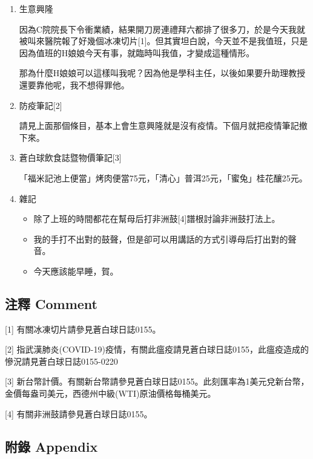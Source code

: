\documentclass[a5paper, 11pt
]{book}
\providecommand{\tightlist}{%
  \setlength{\itemsep}{0pt}\setlength{\parskip}{0pt}}
\begin{document}
\begin{enumerate}
\def\labelenumi{\arabic{enumi}.}
\item
  生意興隆

  因為C院院長下令衝業績，結果開刀房連禮拜六都排了很多刀，於是今天我就被叫來醫院報了好幾個冰凍切片{[}1{]}。但其實坦白說，今天並不是我值班，只是因為值班的H娘娘今天有事，就臨時叫我值，才變成這種情形。

  那為什麼H娘娘可以這樣叫我呢？因為他是學科主任，以後如果要升助理教授還要靠他呢，我不想得罪他。
\item
  防疫筆記{[}2{]}

  請見上面那個條目，基本上會生意興隆就是沒有疫情。下個月就把疫情筆記撤下來。
\item
  蒼白球飲食誌暨物價筆記{[}3{]}

  「福米記池上便當」烤肉便當75元，「清心」普洱25元，「蜜兔」桂花釀25元。
\item
  雜記

  \begin{itemize}
  \tightlist
  \item
    除了上班的時間都花在幫母后打非洲鼓{[}4{]}譜根討論非洲鼓打法上。
  \item
    我的手打不出對的鼓聲，但是卻可以用講話的方式引導母后打出對的聲音。
  \item
    今天應該能早睡，賀。
  \end{itemize}
\end{enumerate}

\hypertarget{ux6ce8ux91cb-comment-90}{%
\subsection{注釋 Comment}\label{ux6ce8ux91cb-comment-90}}

{[}1{]} 有關冰凍切片請參見蒼白球日誌0155。

{[}2{]}
指武漢肺炎(COVID-19)疫情，有關此瘟疫請見蒼白球日誌0155，此瘟疫造成的慘況請見蒼白球日誌0155-0220

{[}3{]}
新台幣計價。有關新台幣請參見蒼白球日誌0155。此刻匯率為1美元兌新台幣，金價每盎司美元，西德州中級(WTI)原油價格每桶美元。

{[}4{]} 有關非洲鼓請參見蒼白球日誌0155。

\hypertarget{ux9644ux9304-appendix-90}{%
\subsection{附錄 Appendix}\label{ux9644ux9304-appendix-90}}
\end{document}
